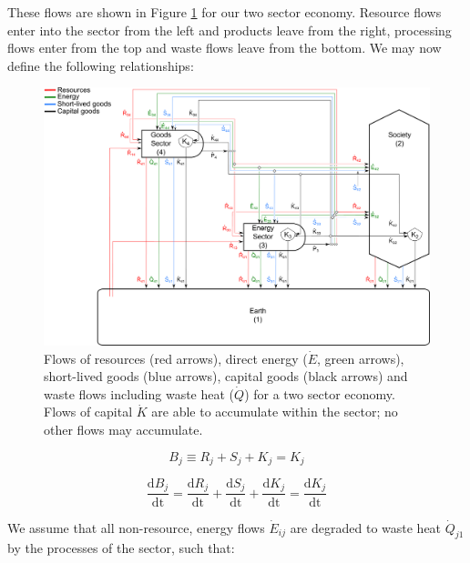 These flows are shown in Figure \ref{fig:PERKS} for our two sector economy. Resource flows enter into the sector from the left and products leave from the right, processing flows enter from the top and waste flows leave from the bottom. We may now define the following relationships:

\begin{figure}[h!]
\includegraphics[width=1.0\linewidth]{Chapter_Example_D/images/PERKS_two_sector.pdf}
\caption{Flows of resources (red arrows), direct energy ($\dot{E}$, green arrows), short-lived goods (blue arrows), capital goods (black arrows) and waste flows including waste heat ($\dot{Q}$) for a two sector economy. Flows of capital $\dot{K}$ are able to accumulate within the sector; no other flows may accumulate.}
\label{fig:PERKS}
\end{figure}

\begin{equation}\label{eq:D_def_R_S_K}
B_{j} \equiv R_{j} + S_{j} + K_{j} = K_{j}
\end{equation}



\begin{equation}\label{eq:D_def_acc_R_S_K}
\frac{\textrm{d}B_{j}}{\textrm{dt}} =\frac{\textrm{d}R_{j}}{\textrm{dt}} + \frac{\textrm{d}S_{j}}{\textrm{dt}} + \frac{\textrm{d}K_{j}}{\textrm{dt}} = \frac{\textrm{d}K_{j}}{\textrm{dt}}
\end{equation}

We assume that all non-resource, energy flows $\dot{E}_{ij}$ are degraded to waste heat $\dot{Q}_{j1}$ by the processes of the sector, such that:

